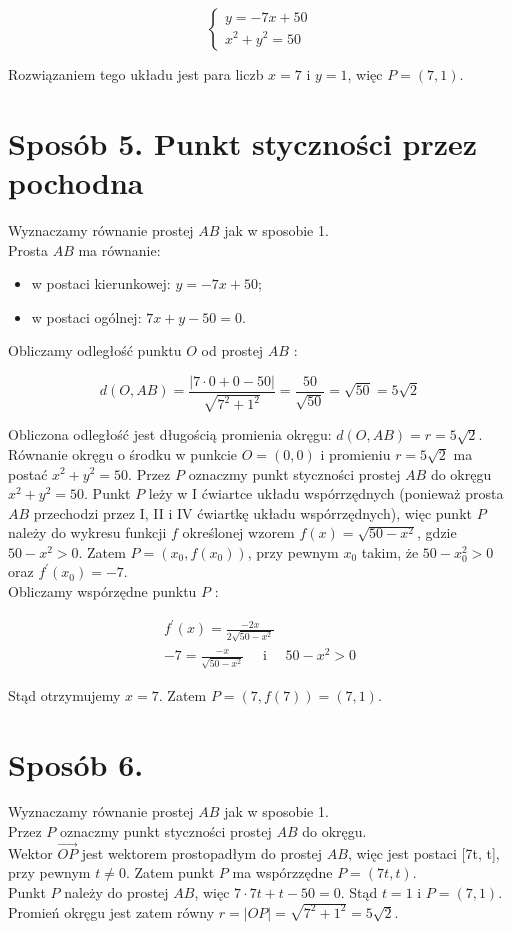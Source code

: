 \documentclass[10pt]{article}
\begin{document}
$$
\left\{\begin{array}{l}
y=-7 x+50 \\
x^{2}+y^{2}=50
\end{array}\right.
$$

Rozwiązaniem tego układu jest para liczb $x=7$ i $y=1$, więc $P=(7,1)$.

\section*{Sposób 5. Punkt styczności przez pochodna}
Wyznaczamy równanie prostej $A B$ jak w sposobie 1.\\
Prosta $A B$ ma równanie:

\begin{itemize}
  \item w postaci kierunkowej: $y=-7 x+50$;
  \item w postaci ogólnej: $7 x+y-50=0$.
\end{itemize}

Obliczamy odległość punktu $O$ od prostej $A B$ :

$$
d(O, A B)=\frac{|7 \cdot 0+0-50|}{\sqrt{7^{2}+1^{2}}}=\frac{50}{\sqrt{50}}=\sqrt{50}=5 \sqrt{2}
$$

Obliczona odległość jest długością promienia okręgu: $d(O, A B)=r=5 \sqrt{2}$.\\
Równanie okręgu o środku w punkcie $O=(0,0)$ i promieniu $r=5 \sqrt{2}$ ma postać $x^{2}+y^{2}=50$. Przez $P$ oznaczmy punkt styczności prostej $A B$ do okręgu $x^{2}+y^{2}=50$. Punkt $P$ leży w I ćwiartce układu wspórrzędnych (ponieważ prosta $A B$ przechodzi przez I, II i IV ćwiartkę układu wspórrzędnych), więc punkt $P$ należy do wykresu funkcji $f$ określonej wzorem $f(x)=\sqrt{50-x^{2}}$, gdzie $50-x^{2}>0$. Zatem $P=\left(x_{0}, f\left(x_{0}\right)\right)$, przy pewnym $x_{0}$ takim, że $50-x_{0}^{2}>0$ oraz $f^{\prime}\left(x_{0}\right)=-7$.\\
Obliczamy wspórzędne punktu $P$ :

$$
\begin{gathered}
f^{\prime}(x)=\frac{-2 x}{2 \sqrt{50-x^{2}}} \\
-7=\frac{-x}{\sqrt{50-x^{2}}} \quad \text { i } \quad 50-x^{2}>0
\end{gathered}
$$

Stąd otrzymujemy $x=7$. Zatem $P=(7, f(7))=(7,1)$.

\section*{Sposób 6.}
Wyznaczamy równanie prostej $A B$ jak w sposobie 1.\\
Przez $P$ oznaczmy punkt styczności prostej $A B$ do okręgu.\\
Wektor $\overrightarrow{O P}$ jest wektorem prostopadłym do prostej $A B$, więc jest postaci [7t, t], przy pewnym $t \neq 0$. Zatem punkt $P$ ma wspórzzędne $P=(7 t, t)$.\\
Punkt $P$ należy do prostej $A B$, więc $7 \cdot 7 t+t-50=0$. Stąd $t=1$ i $P=(7,1)$. Promień okręgu jest zatem równy $r=|O P|=\sqrt{7^{2}+1^{2}}=5 \sqrt{2}$.
\end{document}
